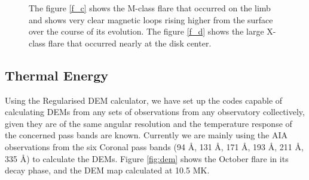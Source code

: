 \documentclass[a4paper,11pt]{article}
\begin{document}
\begin{figure}[h!]
    \centering
    \caption{The figure \ref{f_c} shows the M-class flare that occurred on the limb and shows very clear magnetic loops rising higher from the surface over the course of its evolution. The figure \ref{f_d} shows the large X-class flare that occurred nearly at the disk center.}
    \label{fig:flares}
\end{figure}

\subsection*{Thermal Energy}

Using the Regularised DEM calculator, we have set up the codes capable of calculating DEMs from any sets of observations from any observatory collectively, given they are of the same angular resolution and the temperature response of the concerned pass bands are known. Currently we are mainly using the AIA observations from the six Coronal pass bands (94 \AA, 131 \AA, 171 \AA, 193 \AA, 211 \AA, 335 \AA) to calculate the DEMs. Figure \ref{fig:dem} shows the October flare in its decay phase, and the DEM map calculated at 10.5 MK.
\end{document}
